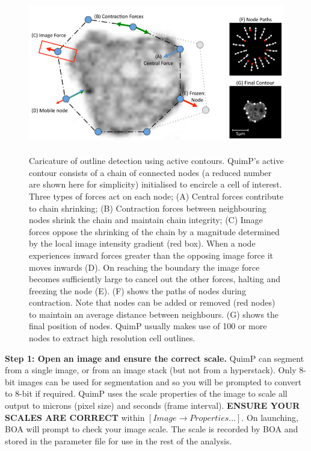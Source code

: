 \documentclass[a4paper,12pt]{article}
\begin{document}
\begin{figure}[ht]
   \centering
   \includegraphics[height=7cm]{activeContour.png} %
   \caption{Caricature of outline detection using active
contours.
QuimP's active contour consists of a chain of connected
nodes (a reduced number are shown here for simplicity) initialised
to encircle a cell of interest. Three types of forces act on each
node; (A) Central forces contribute to chain shrinking; (B) Contraction
forces between neighbouring nodes shrink the chain and maintain chain
integrity; (C) Image forces oppose the shrinking of the chain by a
magnitude determined by the local image intensity gradient (red box).
When a node experiences inward forces greater than the opposing
image force it moves inwards (D). On reaching the boundary the image force becomes
sufficiently large to cancel out the other forces, halting and freezing
the node (E). (F) shows the paths of nodes during contraction. Note
that nodes can be added or removed (red nodes) to maintain an average
distance between neighbours. (G) shows the final position of nodes.
QuimP usually makes use of 100 or more nodes to extract high resolution
cell outlines. \cite{Tyson2010}}
   \label{activeContour}
\end{figure}


\textbf{Step 1: Open an image and ensure the correct scale.}  QuimP can segment from a single image, or from an image stack
(but not from a hyperstack).  Only 8-bit images can be used for segmentation and so you will be prompted to convert to 8-bit 
if required.  QuimP uses the scale properties of the image to scale all output to
 microns (pixel size) and seconds (frame interval).  \textbf{ENSURE YOUR SCALES ARE CORRECT} within $[Image\rightarrow Properties...]$.
 On launching, BOA will prompt to check your image scale. The scale is recorded by BOA and stored in the parameter file for
 use in the rest of the analysis. 
\end{document}
